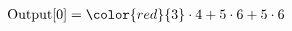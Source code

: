 \documentclass[preview]{standalone}
\begin{document}
\begin{align*}
\text{Output[0]} = \color{red}{3} \cdot 4 + 5 \cdot 6 +  5 \cdot 6
\end{align*}
\end{document}
